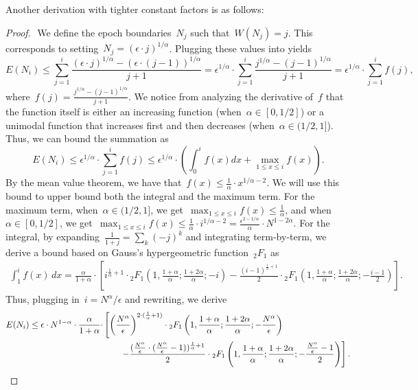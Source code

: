 \documentclass[sigconf]{acmart}
\begin{document}
Another derivation with tighter constant factors is as follows:
\begin{proof} ‌
    We define the epoch boundaries~$N_j$ such that~$W(N_j)=j$. 
    This corresponds to setting~$N_j=(\epsilon \cdot j)^{1/\alpha}$.
    Plugging these values into  yields
    $$
    E(N_i) \leq \sum_{j=1}^i \frac{(\epsilon \cdot j)^{1/\alpha} - (\epsilon \cdot (j-1))^{1/\alpha}}{j+1} = \epsilon^{1/\alpha} \cdot \sum_{j=1}^i \frac{j^{1/\alpha} - (j-1)^{1/\alpha}}{j+1} = \epsilon^{1/\alpha} \cdot \sum_{j=1}^i f(j),
    $$
    where~$f(j)=\frac{j^{1/\alpha}-(j-1)^{1/\alpha}}{j+1}$. 
    We notice from analyzing the derivative of~$f$ that the function itself is either an increasing function (when~$\alpha \in [0, 1/2]$) or a unimodal function that increases first and then decreases (when~$\alpha \in (1/2, 1]$).
    Thus, we can bound the summation as
    $$
    E(N_i) \leq \epsilon^{1/\alpha} \cdot \sum_{j=1}^i f(j) \leq \epsilon^{1/\alpha} \cdot \left( \int_0^i f(x) dx + \max_{1 \leq x \leq i} f(x) \right).
    $$
    By the mean value theorem, we have that~$f(x) \leq \frac1\alpha \cdot x^{1/\alpha-2}$.
    We will use this bound to upper bound both the integral and the maximum term.
    For the maximum term, when~$\alpha \in (1/2, 1]$, we get~$\max_{1 \leq x \leq i} f(x) \leq \frac1\alpha$, and when~$\alpha \in [0, 1/2]$, we get~$\max_{1 \leq x \leq i} f(x) \leq \frac1\alpha \cdot i^{1/\alpha-2} = \frac{\epsilon^{2-1/\alpha}}\alpha \cdot N^{1-2\alpha}$.
    For the integral, by expanding~$\frac{1}{1+j} = \sum_k (-j)^k$ and integrating term-by-term, we derive a bound based on Gauss's hypergeometric function~${}_2F_1$ as
    \begin{align*}
        \int_1^i f(x) \, dx = \frac{\alpha}{1+\alpha} \cdot \left[ i^{\frac1\alpha+1} \cdot {}_2F_1\left( 1, \frac{1+\alpha}{\alpha}; \frac{1+2\alpha}{\alpha}; -i \right) - \frac{(i-1)^{\frac1\alpha+1}}2 \cdot {}_2F_1\left( 1, \frac{1+\alpha}\alpha; \frac{1+2\alpha}\alpha; -\frac{i-1}{2} \right) \right].
    \end{align*}
    Thus, plugging in~$i=N^\alpha/\epsilon$ and rewriting, we derive
    \begin{align*}
        E(N_i) \leq \epsilon \cdot N^{1-\alpha} \cdot \frac{\alpha}{1+\alpha} \cdot & \left[ \left( \frac{N^\alpha}\epsilon \right)^{2 \cdot (\frac1\alpha+1)} \cdot {}_2F_1\left( 1, \frac{1+\alpha}{\alpha}; \frac{1+2\alpha}{\alpha}; -\frac{N^\alpha}\epsilon \right) \vphantom{\frac{(\frac{N^\alpha}\epsilon-1)^{\frac1\alpha+1}}2} \right. \\
        & \left. \qquad - \frac{(\frac{N^\alpha}\epsilon \cdot (\frac{N^\alpha}\epsilon-1))^{\frac1\alpha+1}}2 \cdot {}_2F_1\left( 1, \frac{1+\alpha}\alpha; \frac{1+2\alpha}\alpha; -\frac{\frac{N^\alpha}\epsilon-1}{2} \right) \right].
    \end{align*}


\end{proof}
\end{document}
